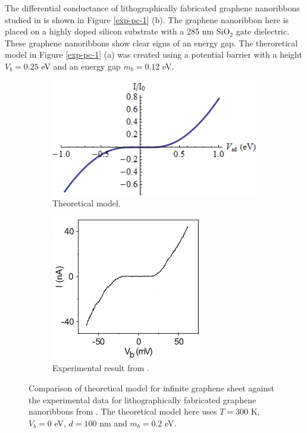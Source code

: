 		The differential conductance of lithographically fabricated graphene nanoribbons studied in \cite{b21} is shown in Figure \ref{exp-pc-1} (b). The graphene nanoribbon here is placed on a highly doped silicon substrate with a 285 nm SiO$_{2}$ gate dielectric. These graphene nanoribbons show clear signs of an energy gap. The theroretical model in Figure \ref{exp-pc-1} (a) was created using a potential barrier with a height $V_{b}=0.25$ eV and an energy gap $m_{b}=0.12$ eV.

		\begin{figure}[h]
			\begin{subfigure}{0.45\textwidth}
				\centerline{\includegraphics[scale=0.5]{images/exp-c-2}}
				\caption{Theoretical model.}
			\end{subfigure}
			\hspace{1cm}
			\begin{subfigure}{0.45\textwidth}
				\centerline{\includegraphics[scale=0.7]{images/exp-pc-2}}
				\caption{Experimental result from \cite{b21}.}
			\end{subfigure}
			\caption{Comparison of theoretical model for infinite graphene sheet against the experimental data for lithographically fabricated graphene nanoribbons from \cite{b21}. The theoretical model here uses $T=300$ K, $V_{b}=0$ eV, $d=100$ nm and $m_{b}=0.2$ eV.}
			\label{exp-pc-2}
		\end{figure}

